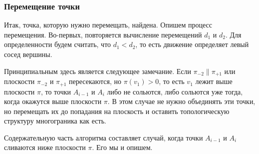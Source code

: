 \documentclass[a4paper,12pt, titlepage]{article}
\begin{document}
\subsubsection{Перемещение точки}
\begin{flushleft}
 Итак, точка, которую нужно перемещать, найдена. Опишем процесс перемещения. Во-первых, повторяется 
вычисление перемещений $d_{1}$ и $d_{2}$. Для определенности будем считать, что $d_{1} < d_{2}$, то
есть движение определяет левый сосед вершины.
\end{flushleft}
\begin{flushleft}
  Принципиальным здесь является следующее замечание. Если $\pi_{-2} \parallel \pi_{+1}$ или плоскости
$\pi_{-2}$ и $\pi_{+1}$ пересекаются, но $\pi(v_{1}) > 0$, то есть $v_{1}$ лежит выше плоскости $\pi$, 
то точки $A_{i - 1}$ и $A_{i}$ либо не сольются, либо сольются уже тогда, когда окажутся выше плоскости 
$\pi$. В этом случае не нужно объединять эти точки, но перемещать их до попадания на плоскость и оставить
топологическую структуру многограника как есть.
\end{flushleft}
\begin{flushleft}
  Содержательную часть алгоритма составляет случай, когда точки $A_{i -1 }$ и $A_{i}$ сливаются ниже 
плоскости $\pi$. Его мы и опишем.
\end{flushleft}
\end{document}
